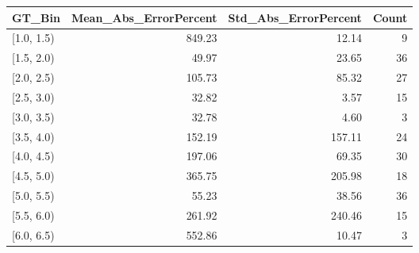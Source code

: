 \begin{tabular}{lrrr}
\toprule
GT_Bin & Mean_Abs_ErrorPercent & Std_Abs_ErrorPercent & Count \\
\midrule
[1.0, 1.5) & 849.23 & 12.14 & 9 \\
[1.5, 2.0) & 49.97 & 23.65 & 36 \\
[2.0, 2.5) & 105.73 & 85.32 & 27 \\
[2.5, 3.0) & 32.82 & 3.57 & 15 \\
[3.0, 3.5) & 32.78 & 4.60 & 3 \\
[3.5, 4.0) & 152.19 & 157.11 & 24 \\
[4.0, 4.5) & 197.06 & 69.35 & 30 \\
[4.5, 5.0) & 365.75 & 205.98 & 18 \\
[5.0, 5.5) & 55.23 & 38.56 & 36 \\
[5.5, 6.0) & 261.92 & 240.46 & 15 \\
[6.0, 6.5) & 552.86 & 10.47 & 3 \\
\bottomrule
\end{tabular}
